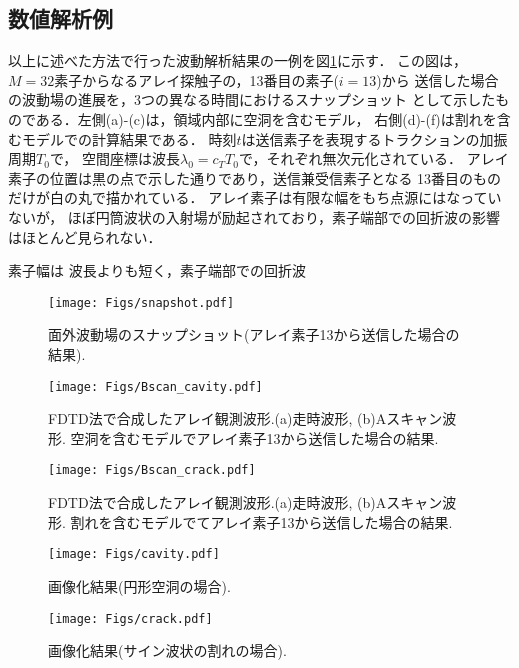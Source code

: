 \subsection{数値解析例}
以上に述べた方法で行った波動解析結果の一例を図\ref{fig:snapshot}に示す．
この図は，$M=32$素子からなるアレイ探触子の，13番目の素子($i=13$)から
送信した場合の波動場の進展を，3つの異なる時間におけるスナップショット
として示したものである．左側(a)-(c)は，領域内部に空洞を含むモデル，
右側(d)-(f)は割れを含むモデルでの計算結果である．
時刻$t$は送信素子を表現するトラクションの加振周期$T_0$で，
空間座標は波長$\lambda_0=c_TT_0$で，それぞれ無次元化されている．
アレイ素子の位置は黒の点で示した通りであり，送信兼受信素子となる
13番目のものだけが白の丸で描かれている．
アレイ素子は有限な幅をもち点源にはなっていないが，
ほぼ円筒波状の入射場が励起されており，素子端部での回折波の影響
はほとんど見られない．

素子幅は
波長よりも短く，素子端部での回折波
\begin{figure}[h]
	\begin{center}
	\texttt{[image: Figs/snapshot.pdf]} 
	\end{center}
	\caption{面外波動場のスナップショット(アレイ素子13から送信した場合の結果).} 
	\label{fig:snapshot}
\end{figure}
\begin{figure}[h]
	\begin{center}
	\texttt{[image: Figs/Bscan\_cavity.pdf]} 
	\end{center}
	\caption{FDTD法で合成したアレイ観測波形.(a)走時波形, (b)Aスキャン波形. 
	空洞を含むモデルでアレイ素子13から送信した場合の結果.} 
	\label{fig:bscan_cavity}
\end{figure}
\begin{figure}[h]
	\begin{center}
	\texttt{[image: Figs/Bscan\_crack.pdf]} 
	\end{center}
	\caption{FDTD法で合成したアレイ観測波形.(a)走時波形, (b)Aスキャン波形. 
	割れを含むモデルでてアレイ素子13から送信した場合の結果.} 
	\label{fig:bscan_crack}
\end{figure}
\begin{figure}[h]
	\begin{center}
	\texttt{[image: Figs/cavity.pdf]} 
	\end{center}
	\caption{画像化結果(円形空洞の場合).} 
	\label{fig:cavity}
\end{figure}
\begin{figure}[h]
	\begin{center}
	\texttt{[image: Figs/crack.pdf]} 
	\end{center}
	\caption{画像化結果(サイン波状の割れの場合).} 
	\label{fig:crack}
\end{figure}
